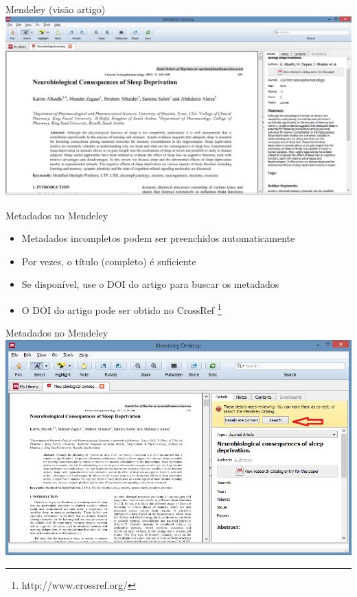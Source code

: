 \documentclass{beamer}
\begin{document}
\begin{frame}{Mendeley (visão artigo)}
  \includegraphics[width=1.2\textwidth]{Referencias/mendeley-artigo}
\end{frame}

\begin{frame}{Metadados no Mendeley}
  \begin{itemize}
  \item Metadados incompletos podem ser preenchidos automaticamente
  \item Por vezes, o título (completo) é suficiente
  \item Se disponível, use o DOI do artigo para buscar os metadados
  \item O DOI do artigo pode ser obtido no CrossRef
    \footnote{http://www.crossref.org/}
  \end{itemize}
\end{frame}

\begin{frame}{Metadados no Mendeley}
  \includegraphics[width=\textwidth]{Referencias/mendeley-busca1}
\end{frame}
\end{document}

